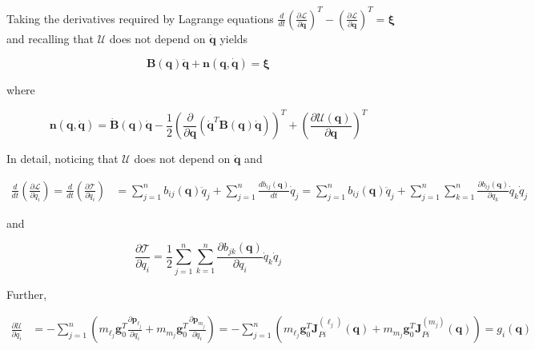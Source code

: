 \documentclass[10pt]{article}
\begin{document}
Taking the derivatives required by Lagrange equations $
\frac{d}{d t}\left(\frac{\partial \mathcal{L}}{\partial \dot{\boldsymbol{q}}}\right)^{T}-\left(\frac{\partial \mathcal{L}}{\partial \boldsymbol{q}}\right)^{T}=\boldsymbol{\xi}
$ and recalling that $\mathcal{U}$ does not depend on $\dot{\boldsymbol{q}}$ yields

$$
\boldsymbol{B}(\boldsymbol{q}) \ddot{\boldsymbol{q}}+\boldsymbol{n}(\boldsymbol{q}, \dot{\boldsymbol{q}})=\boldsymbol{\xi}
$$

where

$$
\boldsymbol{n}(\boldsymbol{q}, \dot{\boldsymbol{q}})=\dot{\boldsymbol{B}}(\boldsymbol{q}) \dot{\boldsymbol{q}}-\frac{1}{2}\left(\frac{\partial}{\partial \boldsymbol{q}}\left(\dot{\boldsymbol{q}}^{T} \boldsymbol{B}(\boldsymbol{q}) \dot{\boldsymbol{q}}\right)\right)^{T}+\left(\frac{\partial \mathcal{U}(\boldsymbol{q})}{\partial \boldsymbol{q}}\right)^{T}
$$

In detail, noticing that $\mathcal{U}$ does not depend on $\dot{\boldsymbol{q}}$ and 

$$
\begin{aligned}
\frac{d}{d t}\left(\frac{\partial \mathcal{L}}{\partial \dot{q}_{i}}\right)=\frac{d}{d t}\left(\frac{\partial \mathcal{T}}{\partial \dot{q}_{i}}\right) & =\sum_{j=1}^{n} b_{i j}(\boldsymbol{q}) \ddot{q}_{j}+\sum_{j=1}^{n} \frac{d b_{i j}(\boldsymbol{q})}{d t} \dot{q}_{j} =\sum_{j=1}^{n} b_{i j}(\boldsymbol{q}) \ddot{q}_{j}+\sum_{j=1}^{n} \sum_{k=1}^{n} \frac{\partial b_{i j}(\boldsymbol{q})}{\partial q_{k}} \dot{q}_{k} \dot{q}_{j}
\end{aligned}
$$

and

$$
\frac{\partial \mathcal{T}}{\partial q_{i}}=\frac{1}{2} \sum_{j=1}^{n} \sum_{k=1}^{n} \frac{\partial b_{j k}(\boldsymbol{q})}{\partial q_{i}} \dot{q}_{k} \dot{q}_{j}
$$

 Further,

$$
\begin{aligned}
\frac{\partial \mathcal{U}}{\partial q_{i}} & =-\sum_{j=1}^{n}\left(m_{\ell_{j}} \boldsymbol{g}_{0}^{T} \frac{\partial \boldsymbol{p}_{\ell_{j}}}{\partial q_{i}}+m_{m_{j}} \boldsymbol{g}_{0}^{T} \frac{\partial \boldsymbol{p}_{m_{j}}}{\partial q_{i}}\right) =-\sum_{j=1}^{n}\left(m_{\ell_{j}} \boldsymbol{g}_{0}^{T} \boldsymbol{J}_{P i}^{\left(\ell_{j}\right)}(\boldsymbol{q})+m_{m_{j}} \boldsymbol{g}_{0}^{T} \boldsymbol{J}_{P i}^{\left(m_{j}\right)}(\boldsymbol{q})\right)=g_{i}(\boldsymbol{q})
\end{aligned}
$$
\end{document}
